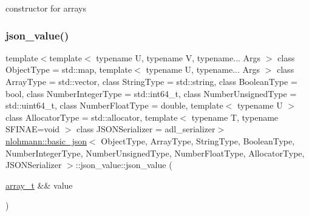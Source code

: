 constructor for arrays 

\mbox{\label{unionnlohmann_1_1basic__json_1_1json__value_a69cd49ed5ddf12af184de009c38e90b4}} 
\subsubsection{\texorpdfstring{json\_value()}{json\_value()}\hspace{0.1cm}{\footnotesize\ttfamily [12/12]}}
{\footnotesize\ttfamily template$<$template$<$ typename U, typename V, typename... Args $>$ class Object\+Type = std\+::map, template$<$ typename U, typename... Args $>$ class Array\+Type = std\+::vector, class String\+Type  = std\+::string, class Boolean\+Type  = bool, class Number\+Integer\+Type  = std\+::int64\+\_\+t, class Number\+Unsigned\+Type  = std\+::uint64\+\_\+t, class Number\+Float\+Type  = double, template$<$ typename U $>$ class Allocator\+Type = std\+::allocator, template$<$ typename T, typename S\+F\+I\+N\+A\+E=void $>$ class J\+S\+O\+N\+Serializer = adl\+\_\+serializer$>$ \\
\mbox{\hyperlink{classnlohmann_1_1basic__json}{nlohmann\+::basic\+\_\+json}}$<$ Object\+Type, Array\+Type, String\+Type, Boolean\+Type, Number\+Integer\+Type, Number\+Unsigned\+Type, Number\+Float\+Type, Allocator\+Type, J\+S\+O\+N\+Serializer $>$\+::json\+\_\+value\+::json\+\_\+value (\begin{DoxyParamCaption}\item[{\mbox{\hyperlink{classnlohmann_1_1basic__json_ae095578e03df97c5b3991787f1056374}{array\+\_\+t}} \&\&}]{value }\end{DoxyParamCaption})\hspace{0.3cm}{\ttfamily [inline]}}



